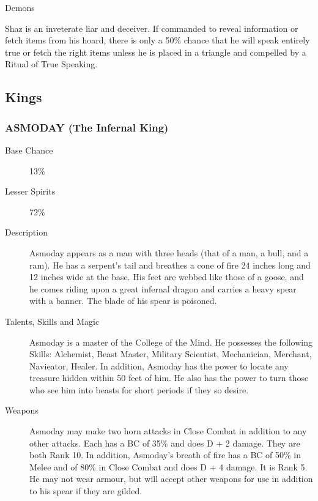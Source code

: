 \begin{mmgroup}{Demons}
\begin{mmcomment}
 Shaz is an inveterate liar and deceiver.  If commanded to
reveal information or fetch items from his hoard, there is only a
50\% chance that he will speak entirely true or fetch the right items
unless he is placed in a triangle and compelled by a Ritual of True
Speaking.

\end{mmcomment}

\subsection{Kings}

\subsubsection{ASMODAY (The Infernal King)}

\begin{description}

\item[Base Chance] 13\%

\item[Lesser Spirits] 72\%

\item[Description] Asmoday appears as a man with three heads (that of a
man, a bull, and a ram). He has a serpent's tail and breathes a cone
of fire 24 inches long and 12 inches wide at the base.  His feet are
webbed like those of a goose, and he comes riding upon a great
infernal dragon and carries a heavy spear with a banner. The blade of
his spear is poisoned.

\item[Talents, Skills and Magic] Asmoday is a master of the College of the Mind.  He
possesses the following Skills: Alchemist, Beast Master, Military
Scientist, Mechanician, Merchant, Navieator, Healer.  In addition,
Asmoday has the power to locate any treasure hidden within 50 feet of
him.  He also has the power to turn those who see him into beasts for
short periods if they so desire.

\item[Weapons] Asmoday may make two horn attacks in Close Combat in
addition to any other attacks.  Each has a BC of 35\% and does D + 2
damage.  They are both Rank 10.  In addition, Asmoday's breath of fire
has a BC of 50\% in Melee and of 80\% in Close Combat and does D + 4
damage.  It is Rank 5.  He may not wear armour, but will accept other
weapons for use in addition to his spear if they are gilded.


\end{description}
\end{mmgroup}
